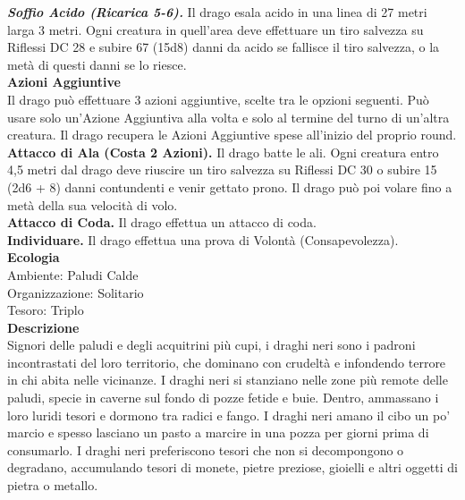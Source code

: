 \begin{multicols}{2}
\emph{\textbf{Soffio Acido (Ricarica 5-6).}} Il drago esala acido in una linea di 27 metri larga 3 metri. Ogni creatura in quell'area deve effettuare un tiro salvezza su Riflessi DC  28 e subire 67 (15d8) danni da acido se fallisce il tiro salvezza, o la metà di questi danni se lo riesce.\\
\textbf{Azioni Aggiuntive}\\
Il drago può effettuare 3 azioni aggiuntive, scelte tra le opzioni seguenti. Può usare solo un'Azione Aggiuntiva alla volta e solo al termine del turno di un'altra creatura. Il drago recupera le Azioni Aggiuntive spese all'inizio del proprio round.\\
\textbf{Attacco di Ala (Costa 2 Azioni).} Il drago batte le ali. Ogni creatura entro 4,5 metri dal drago deve riuscire un tiro salvezza su Riflessi DC  30 o subire 15 (2d6 + 8) danni contundenti e venir gettato prono. Il drago può poi volare fino a metà della sua velocità di volo.\\
\textbf{Attacco di Coda.} Il drago effettua un attacco di coda.  \\
\textbf{Individuare.} Il drago effettua una prova di Volontà (Consapevolezza).\\
\textbf{Ecologia}\\
Ambiente: Paludi Calde\\
Organizzazione: Solitario\\
Tesoro: Triplo\\
\textbf{Descrizione}\\
Signori delle paludi e degli acquitrini più cupi, i draghi neri sono i padroni incontrastati del loro territorio, che dominano con crudeltà e infondendo terrore in chi abita nelle vicinanze. I draghi neri si stanziano nelle zone più remote delle paludi, specie in caverne sul fondo di pozze fetide e buie. Dentro, ammassano i loro luridi tesori e dormono tra radici e fango. I draghi neri amano il cibo un po’ marcio e spesso lasciano un pasto a marcire in una pozza per giorni prima di consumarlo. I draghi neri preferiscono tesori che non si decompongono o degradano, accumulando tesori di monete, pietre preziose, gioielli e altri oggetti di pietra o metallo.\\


\end{multicols}
